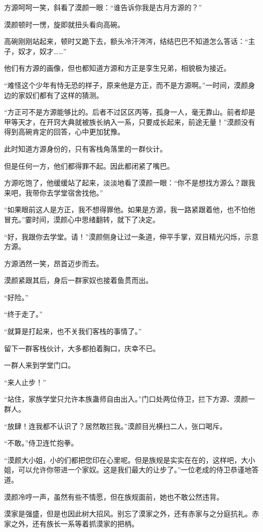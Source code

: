 \begin{this_body}
方源呵呵一笑，斜看了漠颜一眼：“谁告诉你我是古月方源的？”

漠颜顿时一愣，旋即就扭头看向高碗。

高碗刚刚站起来，顿时又跪下去，额头冷汗涔涔，结结巴巴不知道怎么答话：“主子，奴才，奴才……”

他们有方源的画像，但也都知道方源和方正是孪生兄弟，相貌极为接近。

“难怪这个少年有恃无恐的样子，原来他是方正，而不是方源啊。”一时间，漠颜身边的家奴们都有了这样的猜测。

“方正可不是方源能够比的。后者不过区区丙等，孤身一人，毫无靠山。前者却是甲等天才，在开窍大典就被族长纳入一系，只要成长起来，前途无量！”漠颜没有得到高碗肯定的回答，心中更加犹豫。

此时知道方源身份的，只有客栈角落里的一群伙计。

但是任何一方，他们都得罪不起。因此都闭紧了嘴巴。

方源吃饱了，他缓缓站了起来，淡淡地看了漠颜一眼：“你不是想找方源么？跟我来吧，我带你去学堂宿舍找他。”

“如果眼前这人是方正，我不想得罪他。如果是方源，我一路紧跟着他，也不怕他冒充。”霎时间，漠颜心中思绪翻转，就下了决定。

“好，我跟你去学堂。请！”漠颜侧身让过一条道，伸平手掌，双目精光闪烁，示意方源。

方源洒然一笑，昂首迈步而去。

漠颜紧跟其后，身后一群家奴也接着鱼贯而出。

“好险。”

“终于走了。”

“就算是打起来，也不关我们客栈的事情了。”

留下一群客栈伙计，大多都拍着胸口，庆幸不已。

一群人来到学堂门口。

“来人止步！”

“站住，家族学堂只允许本族蛊师自由出入。”门口处两位侍卫，拦下方源、漠颜一群人。

“放肆！连我都不认识了？居然敢拦我。”漠颜目光横扫二人，张口喝斥。

“不敢。”侍卫连忙抱拳。

“漠颜大小姐，小的们都把您印在心里呢。但是族规是实实在在的，这样吧，大小姐，可以允许你带进一个家奴。这是我们最大的让步了。”一位老成的侍卫恭谨地答道。

漠颜冷哼一声，虽然有些不情愿，但在族规面前，她也不敢公然违背。

漠家是强盛，但是也因此树大招风。别忘了漠家之外，还有赤家与之分庭抗礼。赤家之外，还有族长一系等着抓漠家的把柄。


\end{this_body}
